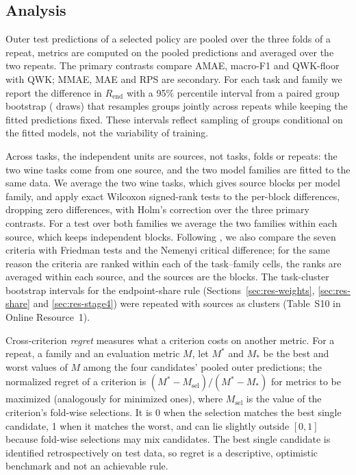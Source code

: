 \documentclass[pdflatex,sn-mathphys-ay]{sn-jnl}
\theoremstyle{thmstyleone}
\theoremstyle{thmstylethree}
\newcommand{\QWKF}{QWK-floor}
\begin{document}
\subsection{Analysis}

Outer test predictions of a selected policy are pooled over the three folds of a repeat, metrics are computed on the pooled predictions and averaged over the two repeats. The primary contrasts compare AMAE, macro-F1 and \QWKF{} with QWK; MMAE, MAE and RPS are secondary. For each task and family we report the difference in $R_{\mathrm{end}}$ with a 95\% percentile interval from a paired group bootstrap (\NBoot{} draws) that resamples groups jointly across repeats while keeping the fitted predictions fixed. These intervals reflect sampling of groups conditional on the fitted models, not the variability of training.

Across tasks, the independent units are sources, not tasks, folds or repeats: the two wine tasks come from one source, and the two model families are fitted to the same data. We average the two wine tasks, which gives \NBlocksFam{} source blocks per model family, and apply exact Wilcoxon signed-rank tests to the per-block differences, dropping zero differences, with Holm's correction over the three primary contrasts. For a test over both families we average the two families within each source, which keeps \NBlocks{} independent blocks. Following \citet{Demsar2006}, we also compare the seven criteria with Friedman tests and the Nemenyi critical difference; for the same reason the criteria are ranked within each of the \NCells{} task--family cells, the ranks are averaged within each source, and the \FriedBlocks{} sources are the blocks. The task-cluster bootstrap intervals for the endpoint-share rule (Sections~\ref{sec:res-weights}, \ref{sec:res-share} and \ref{sec:res-stage4}) were repeated with sources as clusters (Table~S10 in Online Resource~1).

Cross-criterion \emph{regret} measures what a criterion costs on another metric. For a repeat, a family and an evaluation metric $M$, let $M^{*}$ and $M_{*}$ be the best and worst values of $M$ among the four candidates' pooled outer predictions; the normalized regret of a criterion is $(M^{*}-M_{\mathrm{sel}})/(M^{*}-M_{*})$ for metrics to be maximized (analogously for minimized ones), where $M_{\mathrm{sel}}$ is the value of the criterion's fold-wise selections. It is 0 when the selection matches the best single candidate, 1 when it matches the worst, and can lie slightly outside $[0,1]$ because fold-wise selections may mix candidates. The best single candidate is identified retrospectively on test data, so regret is a descriptive, optimistic benchmark and not an achievable rule.
\end{document}
